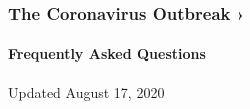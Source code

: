 \href{https://www.nytimes3xbfgragh.onion/news-event/coronavirus?action=click\&pgtype=Article\&state=default\&region=MAIN_CONTENT_3\&context=storylines_faq}{}

\hypertarget{the-coronavirus-outbreak-}{%
\subsubsection{The Coronavirus Outbreak
›}\label{the-coronavirus-outbreak-}}

\hypertarget{frequently-asked-questions}{%
\paragraph{Frequently Asked
Questions}\label{frequently-asked-questions}}

Updated August 17, 2020

